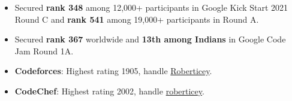 
\begin{itemize}
  \item Secured \textbf{rank 348} among 12,000+ participants in Google Kick Start 2021 Round C and \textbf{rank 541} among 19,000+ participants in Round A.
  \item Secured \textbf{rank 367} worldwide and \textbf{13th among Indians} in Google Code Jam Round 1A.
  \item \textbf{Codeforces}: Highest rating 1905, handle \href{https://codeforces.com/profile/Roberticey}{Roberticey}.
  \item \textbf{CodeChef}: Highest rating 2002, handle \href{https://www.codechef.com/users/roberticey}{roberticey}.
\end{itemize}
